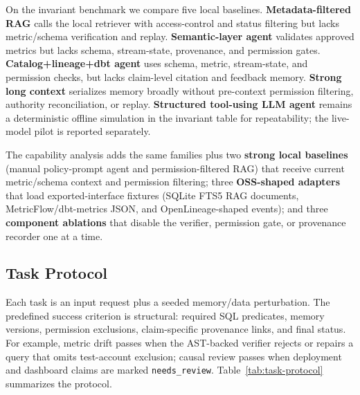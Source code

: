\documentclass[sigconf,nonacm]{acmart}
\newcommand{\code}[1]{\texttt{#1}}
\begin{document}
On the invariant benchmark we compare five local baselines. \textbf{Metadata-filtered RAG} calls the local retriever with access-control and status filtering but lacks metric/schema verification and replay. \textbf{Semantic-layer agent} validates approved metrics but lacks schema, stream-state, provenance, and permission gates. \textbf{Catalog+lineage+dbt agent} uses schema, metric, stream-state, and permission checks, but lacks claim-level citation and feedback memory. \textbf{Strong long context} serializes memory broadly without pre-context permission filtering, authority reconciliation, or replay. \textbf{Structured tool-using LLM agent} remains a deterministic offline simulation in the invariant table for repeatability; the live-model pilot is reported separately.

The capability analysis adds the same families plus two \textbf{strong local baselines} (manual policy-prompt agent and permission-filtered RAG) that receive current metric/schema context and permission filtering; three \textbf{OSS-shaped adapters} that load exported-interface fixtures (SQLite FTS5 RAG documents, MetricFlow/dbt-metrics JSON, and OpenLineage-shaped events); and three \textbf{component ablations} that disable the verifier, permission gate, or provenance recorder one at a time.

\subsection{Task Protocol}
Each task is an input request plus a seeded memory/data perturbation. The predefined success criterion is structural: required SQL predicates, memory versions, permission exclusions, claim-specific provenance links, and final status. For example, metric drift passes when the AST-backed verifier rejects or repairs a query that omits test-account exclusion; causal review passes when deployment and dashboard claims are marked \code{needs\_review}. Table~\ref{tab:task-protocol} summarizes the protocol.
\end{document}

